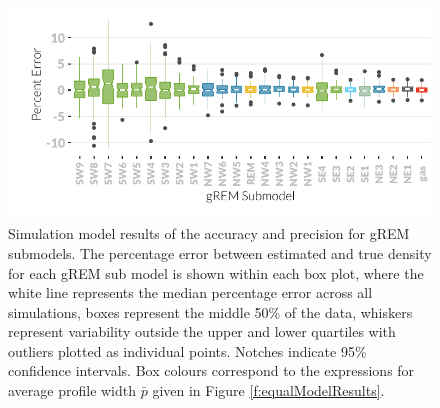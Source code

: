 \begin{knitrout}\footnotesize
{}\color{fgcolor}\begin{figure}[t]

{\centering \includegraphics[width=\textwidth]{figure/gremSubmods-1} 

}

\caption[Simulation model results of the accuracy and precision for gREM submodels]{
Simulation model results of the accuracy and precision for gREM submodels.
The percentage error between estimated and true density for each gREM sub model is shown within each box plot, where the white line represents the median percentage error across all simulations, boxes represent the middle 50\% of the data, whiskers represent variability outside the upper and lower quartiles with outliers plotted as individual points.
Notches indicate 95\% confidence intervals.
Box colours correspond to the expressions for average profile width $\bar{p}$ given in Figure \ref{f:equalModelResults}. 
}\label{fig:gremSubmods}
\end{figure}


\end{knitrout}


